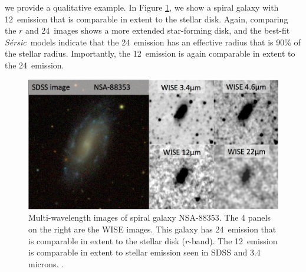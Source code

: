 \documentclass[12pt, preprint]{aastex}
\newcommand{\sers}{{\it S\'{e}rsic}}
\begin{document}
{%

we provide a qualitative example.  In Figure
\ref{nsa88353}, we show a spiral galaxy with 12\micron \
emission that is comparable in extent to the stellar disk.  Again,
comparing the $r$ and 24\micron \ images shows a more extended
star-forming disk, and the best-fit \sers \ models indicate that the
24\micron \ emission has an effective radius that is 90\% of the
stellar radius.  Importantly, the 12\micron \ emission is again
comparable in extent to the 24\micron \ emission.



\begin{figure}[h]
\begin{center}
\includegraphics[width=.85\textwidth]{NSA-88353.png}
\end{center}
\caption{ Multi-wavelength images of spiral galaxy NSA-88353.  The 
  4 panels on the right are the WISE images. This
galaxy has 24\micron \ emission that is comparable in extent to the 
stellar disk ($r$-band).  The 12\micron \ emission is comparable in
extent to stellar emission seen in SDSS and 3.4 microns. .}
\label{nsa88353}
\end{figure}

}
\end{document}
